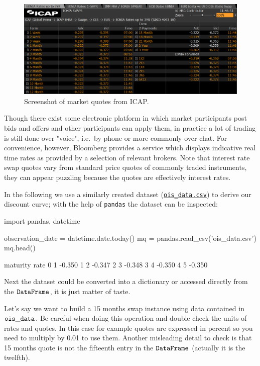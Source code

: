 \begin{figure}[bth]
  \centering
\includegraphics[width=1.\linewidth]{figures/icap_3.png}
\caption{Screenshot of market quotes from ICAP.}
\label{fig:icap}
\end{figure}

Though there exist some electronic platform in which market participants post bids and offers and other participants can apply them, in practice a lot of trading is still done over "voice", i.e.~by phone or more
commonly over chat. For convenience, however, Bloomberg provides a service which displays indicative real time rates as provided by a selection of relevant brokers. Note that interest rate swap quotes vary from standard price quotes of commonly traded instruments, they can appear puzzling because the quotes are effectively interest rates.

In the following we use a similarly created dataset (\href{https://raw.githubusercontent.com/matteosan1/finance_course/develop/libro/input_files/ois_quotes.csv}{\texttt{ois\_data.csv}}) to derive our discount curve; with the help of \texttt{pandas} the dataset can be inspected:

\begin{ipython}
import pandas, datetime

observation_date = datetime.date.today()
mq = pandas.read_csv('ois_data.csv')
mq.head()
\end{ipython}
\begin{ioutput}
 maturity   rate
0       1 -0.350
1       2 -0.347
2       3 -0.348
3       4 -0.350
4       5 -0.350
\end{ioutput}
\noindent
Next the dataset could be converted into a dictionary or accessed directly from the \(\tt{DataFrame}\), it is just matter of taste.

Let's say we want to build a 15 months swap instance using data
contained in \(\tt{ois\_data}\). Be careful when doing this
operation and double check the units of rates and quotes. In
this case for example quotes are expressed in percent so you need to
multiply by 0.01 to use them. Another misleading detail to check is that 15 months quote is not the fifteenth entry in the \(\tt{DataFrame}\) (actually it is the twelfth).

